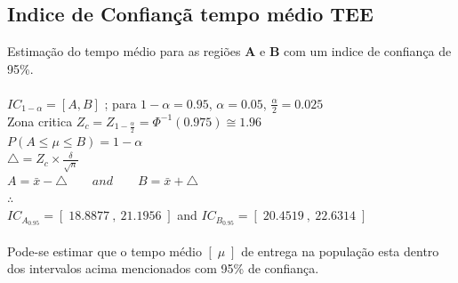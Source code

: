 \subsection{Indice de Confiançã tempo médio TEE}
Estimação do tempo médio para as regiões \textbf{A} e \textbf{B} com um indice de confiança de 95\%. \\
\\
$IC_{1-\alpha}=\left[ A, B\right]$ ; para $1-\alpha = 0.95$, $\alpha=0.05$, $\frac{\alpha}{2}=0.025$ \\
Zona critica $Z_c=Z_{1-\frac{\alpha}{2}}=\Phi^{-1}(0.975) \cong 1.96$ \\
$P\left( A \leqslant \mu \leqslant B \right) = 1-\alpha$ \\
$\triangle=Z_c\times\frac{\delta}{\sqrt{n}}$ \\
$A = \bar{x}-\triangle \qquad and \qquad B = \bar{x}+\triangle$ \\
$\therefore$\\
$IC_{A_{0.95}}=\left[ \; 18.8877 \: , \: 21.1956 \; \right]$ \hspace{1cm} and \hspace{1cm} $IC_{B_{0.95}}=\left[ \; 20.4519 \: , \: 22.6314 \; \right]$\\
\\
\noindent
Pode-se estimar que o tempo médio $\left[ \; \mu \; \right]$ de entrega na população  esta dentro dos intervalos acima mencionados com 95\% de confiança.\\

